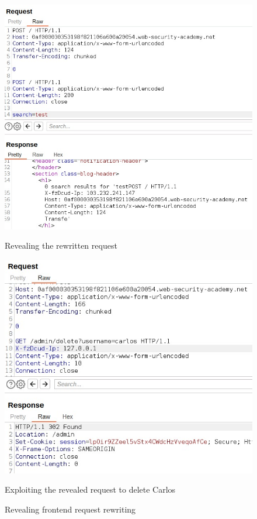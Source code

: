 \documentclass[conference]{IEEEtran}
\begin{document}
\begin{figure}[htbp]
	\centering
	\begin{minipage}[c]{0.45\linewidth}
		\centering
		\includegraphics[width=\linewidth]{results/Frontend_request_rewriting_req1_revealing.jpeg}
		\captionsetup{justification=centering}
		\caption*{Revealing the rewritten request}
		\label{fig:rewriting_req1}
	  \end{minipage}
	  \hfill
	  \begin{minipage}[c]{0.45\linewidth}
		\centering
		\includegraphics[width=\linewidth]{results/Frontend_request_rewriting_req2_exploiting.jpeg}
		\captionsetup{justification=centering}
		\caption*{Exploiting the revealed request to delete Carlos}
		\label{fig:rewriting_req2}
	  \end{minipage}
	
	  \caption{Revealing frontend request rewriting}
	  \label{fig:rewriting}
\end{figure}
\end{document}
